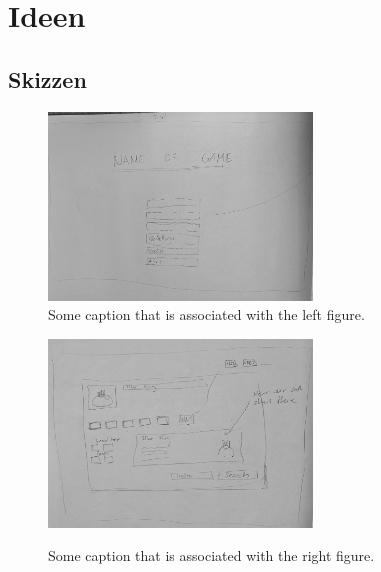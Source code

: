 \chapter{Ideen}

\renewcommand{\figurename}{Abb.}

\section{Skizzen}

    \begin{figure}[H]
        \centering
        \begin{minipage}[H]{7cm}
        \centering
        \includegraphics[width=7cm]{resources/Sk_startpage.jpeg}\\
        \caption{Some caption that is associated with the left figure.}
        \end{minipage}\hfill
        \begin{minipage}[H]{7cm}
        \centering
        \includegraphics[width=7cm]{resources/SK_auswahl.jpeg}\\
        \caption{Some caption that is associated with the right figure.}
        \end{minipage}
    \end{figure}
